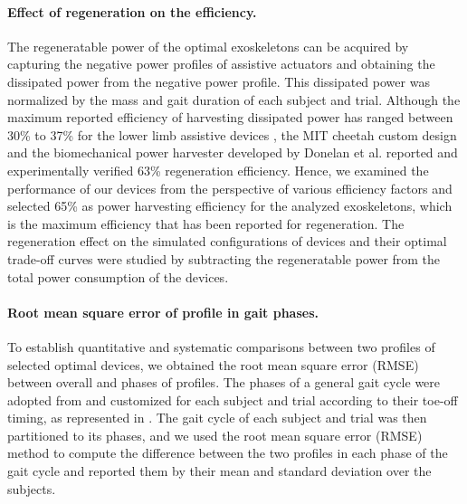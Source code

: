 \documentclass[10pt,letterpaper]{article}
\begin{document}
\paragraph*{Effect of regeneration on the efficiency.} 
The regeneratable power of the optimal exoskeletons can be acquired by capturing the negative power profiles of assistive actuators and obtaining the dissipated power from the negative power profile. This dissipated power was normalized by the mass and gait duration of each subject and trial. Although the maximum reported efficiency of harvesting dissipated power has ranged between 30\% to 37\% for the lower limb assistive devices \cite{140}, the MIT cheetah custom design \cite{144,145} and the biomechanical power harvester developed by Donelan et al. \cite{143} reported and experimentally verified 63\% regeneration efficiency. Hence, we examined the performance of our devices from the perspective of various efficiency factors and selected 65\% as power harvesting efficiency for the analyzed exoskeletons, which is the maximum efficiency that has been reported for regeneration. The regeneration effect on the simulated configurations of devices and their optimal trade-off curves were studied by subtracting the regeneratable power from the total power consumption of the devices.\\
\paragraph*{Root mean square error of profile in gait phases.}  To establish quantitative and systematic comparisons between two profiles of selected optimal devices, we obtained the root mean square error (RMSE) between overall and phases of profiles. The phases of a general gait cycle were adopted from \cite{150,161} and customized for each subject and trial according to their toe-off timing, as represented in . The gait cycle of each subject and trial was then partitioned to its phases, and we used the root mean square error (RMSE) method to compute the difference between the two profiles in each phase of the gait cycle and reported them by their mean and standard deviation over the subjects.
\end{document}
